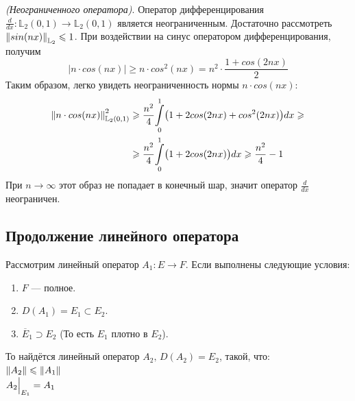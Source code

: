 \documentclass[12pt]{article}
\begin{document}
		\example \textit{(Неограниченного оператора)}. Оператор дифференцирования 
		$\frac{d}{dx} : \mathbb{L}_2(0, 1) \rightarrow \mathbb{L}_2(0, 1)$ является неограниченным. 
		Достаточно рассмотреть $\left\| sin(nx) \right\|_{\mathbb{L}_2} \leqslant 1$. При воздействии на синус оператором дифференцирования, получим
		$$|n \cdot cos(nx)| \geq n \cdot cos^2(nx) = n^2 \cdot \frac{1 + cos(2nx)}{2}$$
		Таким образом, легко увидеть неограниченность нормы $n \cdot cos(nx)$:
		\begin{align*}
			\left\| n \cdot cos(nx) \right\|_{\mathbb{L}_2(0,1)}^2 
			&\geqslant \frac{n^2}{4} \underset{0}{\overset{1}{\int}} \big(1 + 2 cos(2nx) + cos^2(2nx)\big) dx \geqslant \\
			&\geqslant \frac{n^2}{4} \underset{0}{\overset{1}{\int}} \big(1 + 2 cos(2nx)\big) dx \geqslant \frac{n^2}{4} - 1
		\end{align*}
		При $n \rightarrow \infty$ этот образ не попадает в конечный шар, значит оператор $\frac{d}{dx}$ неограничен.
	
	
	\subsection{Продолжение линейного оператора}

		\begin{theorem} \label{th:limitedOperContinue}
			Рассмотрим линейный оператор $A_1 : E \rightarrow F$. Если выполнены следующие условия:
			\begin{enumerate}
				\item $F$ --- полное.
				\item $D(A_1) = E_1 \subset E_2$.
				\item $\overline{E}_1 \supset E_2$ (То есть $E_1$ плотно в $E_2$).
			\end{enumerate}
			То найдётся линейный оператор $A_2,\, D(A_2) = E_2$, такой, что: \\
			$\left\| A_2 \right\| \leqslant \left\| A_1 \right\|$ \\
			$A_2 \Big|_{E_1}^{} = A_1$
		\end{theorem}
	
\end{document}
